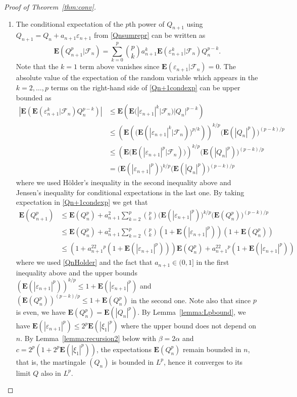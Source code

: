 \documentclass[12pt,a4paper]{article}
\newcommand{\E}{\mathbf E}
\newcommand{\F}{\mathcal F}
\numberwithin{equation}{section}
\begin{document}
\begin{proof}[Proof of Theorem~\ref{thm:conv}]
\begin{enumerate}
\item
The conditional expectation of the $p$th power of $Q_{n+1}$ using $Q_{n+1}=Q_n+a_{n+1}\varepsilon_{n+1}$ from \eqref{Qnsumrepr} can be written as
\begin{equation}\label{Qn+1condexp}
\E(Q_{n+1}^p|\F_n)=\sum_{k=0}^p\binom pka_{n+1}^k\E(\varepsilon_{n+1}^k|\F_n)Q_n^{p-k}.
\end{equation}
Note that the $k=1$ term above vanishes since $\E(\varepsilon_{n+1}|\F_n)=0$.
The absolute value of the expectation of the random variable which appears in the $k=2,\dots,p$ terms on the right-hand side of \eqref{Qn+1condexp}
can be upper bounded as
\begin{equation}\label{QnHolder}\begin{aligned}
\left|\E\left(\E(\varepsilon_{n+1}^k|\F_n)Q_n^{p-k}\right)\right|&\le\E\left(\E(|\varepsilon_{n+1}|^k|\F_n)|Q_n|^{p-k}\right)\\
&\le\left(\E\left(\big(\E(|\varepsilon_{n+1}|^k|\F_n)\big)^{p/k}\right)\right)^{k/p}\big(\E\left(|Q_n|^p\right)\big)^{(p-k)/p}\\
&\le\left(\E\big(\E(|\varepsilon_{n+1}|^p|\F_n)\big)\right)^{k/p}\big(\E\left(|Q_n|^p\right)\big)^{(p-k)/p}\\
&=\big(\E(|\varepsilon_{n+1}|^p)\big)^{k/p}\big(\E\left(|Q_n|^p\right)\big)^{(p-k)/p}
\end{aligned}\end{equation}
where we used H\"older's inequality in the second inequality above and Jensen's inequality for conditional expectations in the last one.
By taking expectation in \eqref{Qn+1condexp} we get that
\begin{equation}\label{EQnp}\begin{aligned}
\E(Q_{n+1}^p)&\le\E(Q_n^p)+a_{n+1}^2\sum_{k=2}^p\binom pk\big(\E(|\varepsilon_{n+1}|^p)\big)^{k/p}\big(\E(Q_n^p)\big)^{(p-k)/p}\\
&\le\E(Q_n^p)+a_{n+1}^2\sum_{k=2}^p\binom pk(1+\E(|\varepsilon_{n+1}|^p))(1+\E(Q_n^p))\\
&\le\left(1+a_{n+1}^22^p(1+\E(|\varepsilon_{n+1}|^p))\right)\E(Q_n^p)+a_{n+1}^22^p(1+\E(|\varepsilon_{n+1}|^p))
\end{aligned}\end{equation}
where we used \eqref{QnHolder} and the fact that $a_{n+1}\in(0,1]$ in the first inequality above
and the upper bounds $(\E(|\varepsilon_{n+1}|^p))^{k/p}\le1+\E(|\varepsilon_{n+1}|^p)$ and $(\E(Q_n^p))^{(p-k)/p}\le1+\E(Q_n^p)$ in the second one.
Note also that since $p$ is even, we have $\E(Q_n^p)=\E(|Q_n|^p)$.
By Lemma~\ref{lemma:Lpbound}, we have $\E(|\varepsilon_{n+1}|^p)\le2^p\E(|\xi_1|^p)$ where the upper bound does not depend on $n$.
By Lemma~\ref{lemma:recursion2} below with $\beta=2\alpha$ and $c=2^p(1+2^p\E(|\xi_1|^p))$, the expectations $\E(Q_n^p)$ remain bounded in $n$,
that is, the martingale $(Q_n)$ is bounded in $L^p$, hence it converges to its limit $Q$ also in $L^p$.
\end{enumerate}
\end{proof}
\end{document}
